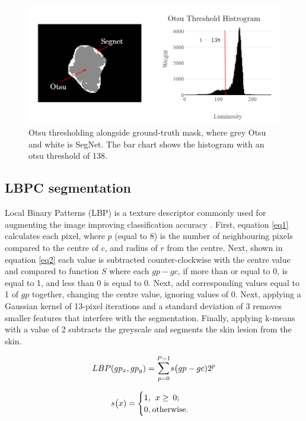 \begin{figure}
\centering
\includegraphics[scale=0.7]{images/otsu3.png}
\caption{Otsu thresholding alongside ground-truth mask, where grey Otsu and white is SegNet. The bar chart shows the histogram with an otsu threshold of 138.} \label{otsu2}
\end{figure}


\subsection{LBPC segmentation}

Local Binary Patterns (LBP) is a texture descriptor commonly used for augmenting the image improving classification accuracy \cite{Pereira2020, Kaya2016}. First, equation \ref{eq1} calculates each pixel, where $p$ (equal to 8) is the number of neighbouring pixels compared to the centre of $c$, and radius of $r$ from the centre. Next, shown in equation \ref{eq2} each value is subtracted counter-clockwise with the centre value and compared to function $S$ where each $gp - gc$, if more than or equal to 0, is equal to 1, and less than 0 is equal to 0. Next, add corresponding values equal to 1 of $gp$ together, changing the centre value, ignoring values of 0. Next, applying a Gaussian kernel of 13-pixel iterations and a standard deviation of 3 removes smaller features that interfere with the segmentation. Finally, applying k-means with a value of 2 subtracts the greyscale and segments the skin lesion from the skin.

\begin{equation} \label{eq1}
LBP(gp_x, gp_y) = \mathlarger{\sum}_{p=0}^{P-1}s\big(gp - gc)2^p
\end{equation}

\begin{equation} \label{eq2}
s\big(x) = 
\begin{cases}
1,\:\:x\geq\:0; \\
0,\:$otherwise$.
\end{cases}
\end{equation}

